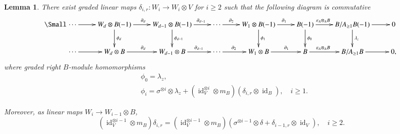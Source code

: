 \documentclass[a4paper,10pt]{amsart}
\newtheorem{lemma}[theorem]{Lemma}
\theoremstyle{definition}
\numberwithin{equation}{section}
\DeclareMathOperator{\id}{id}
\begin{document}
\begin{lemma}\label{lemma: construction of delta_r}
There exist graded linear maps $\delta_{i,r}:W_i\to W_i\otimes V$ for $i\geq 2$ such that the following diagram is commutative
$${\Small
\xymatrix{
\cdots\ar[r] & W_d\otimes B(-1) \ar[r]^{\partial_d}\ar[d]^{\phi_d} &W_{d-1}\otimes B(-1)\ar[r]^(0.65){\partial_{d-1}}\ar[d]^{\phi_{d-1}}&\cdots\ar[r]^(0.35){\partial_{2}} &W_1\otimes B(-1)\ar[r]^(0.55){\partial_{1}}\ar[d]^{\phi_1} &B(-1)\ar[r]^(0.38){{\varepsilon_A\otimes_AB}}\ar[d]^{\phi_0}&B/A_{\geq1}B(-1)\ar[d]^{\lambda_z}\ar[r]&0
\\
\cdots\ar[r] & W_d\otimes B \ar[r]^{\partial_d} &W_{d-1}\otimes B\ar[r]^(0.6){{\partial_{d-1}}}&\cdots\ar[r]^(0.41){{\partial_{2}}} &W_1\otimes B\ar[r]^(0.6){{\partial_{1}}} &B\ar[r]^(0.38){{\varepsilon_A\otimes_AB}}&B/A_{\geq1}B\ar[r]&0,
}
}
$$
where graded right $B$-module homomorphisms
\begin{align*}
&\phi_0=\lambda_z, \\
&\phi_{i}=\sigma^{\otimes i}\otimes \lambda_z+(\id_V^{\otimes i}\otimes m_B)\left(\delta_{i,r}\otimes\id_B\right), \quad i\geq 1.
\end{align*}

Moreover, as linear maps $W_i\to W_{i-1}\otimes B$,
\begin{equation}\label{condition for delta_r}
(\id_V^{\otimes i-1} \otimes m_B)\delta_{i,r}=(\id_V^{\otimes i-1}\otimes m_B)\left(\sigma^{\otimes i-1}\otimes\delta+\delta_{i-1,r}\otimes \id_V\right),
\quad i\geq 2.
\end{equation}
\end{lemma}
\end{document}
